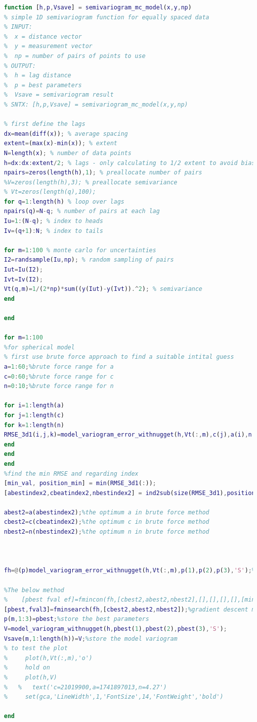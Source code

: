 \documentclass[
	12pt, %
]{fphw}
\begin{document}
\begin{lstlisting}[language=Matlab,escapeinside=``]                                                                     
function [h,p,Vsave] = semivariogram_mc_model(x,y,np)
% simple 1D semivariogram function for equally spaced data
% INPUT:
%  x = distance vector
%  y = measurement vector
%  np = number of pairs of points to use
% OUTPUT:
%  h = lag distance
%  p = best parameters
%  Vsave = semivariogram result
% SNTX: [h,p,Vsave] = semivariogram_mc_model(x,y,np)

% first define the lags
dx=mean(diff(x)); % average spacing
extent=(max(x)-min(x)); % extent
N=length(x); % number of data points
h=dx:dx:extent/2; % lags - only calculating to 1/2 extent to avoid bias
npairs=zeros(length(h),1); % preallocate number of pairs
%V=zeros(length(h),3); % preallocate semivariance
% Vt=zeros(length(q),100);
for q=1:length(h) % loop over lags
npairs(q)=N-q; % number of pairs at each lag
Iu=1:(N-q); % index to heads
Iv=(q+1):N; % index to tails

for m=1:100 % monte carlo for uncertainties
I2=randsample(Iu,np); % random sampling of pairs
Iut=Iu(I2);
Ivt=Iv(I2);
Vt(q,m)=1/(2*np)*sum((y(Iut)-y(Ivt)).^2); % semivariance
end

end

for m=1:100
%for spherical model
% first use brute force approach to find a suitable intital guess
a=1:60;%brute force range for a
c=0:60;%brute force range for c
n=0:10;%brute force range for n

for i=1:length(a)
for j=1:length(c)
for k=1:length(n)
RMSE_3d1(i,j,k)=model_variogram_error_withnugget(h,Vt(:,m),c(j),a(i),n(k),'S');% calculate RMSE for the all a, c and n
end
end
end
%find the min RMSE and regarding index
[min_val, position_min] = min(RMSE_3d1(:));
[abestindex2,cbeatindex2,nbestindex2] = ind2sub(size(RMSE_3d1),position_min);

abest2=a(abestindex2);%the optimum a in brute force method
cbest2=c(cbeatindex2);%the optimum c in brute force method
nbest2=n(nbestindex2);%the optimum n in brute force method



fh=@(p)model_variogram_error_withnugget(h,Vt(:,m),p(1),p(2),p(3),'S');%function handle

%The below method
%    [pbest fval ef]=fmincon(fh,[cbest2,abest2,nbest2],[],[],[],[],[min(h),min(Vt(:,m)),min(Vt(:,m))],[max(h) max(Vt(:,m)) max(Vt(:,m))]);
[pbest,fval3]=fminsearch(fh,[cbest2,abest2,nbest2]);%gradient descent method to find best parameters
p(m,1:3)=pbest;%store the best parameters
V=model_variogram_withnugget(h,pbest(1),pbest(2),pbest(3),'S');
Vsave(m,1:length(h))=V;%store the model variogram
% to test the plot
%     plot(h,Vt(:,m),'o')
%     hold on
%     plot(h,V)
%   %   text('c=21019900,a=1741897013,n=4.27')
%     set(gca,'LineWidth',1,'FontSize',14,'FontWeight','bold')

end

\end{lstlisting}
\end{document}
